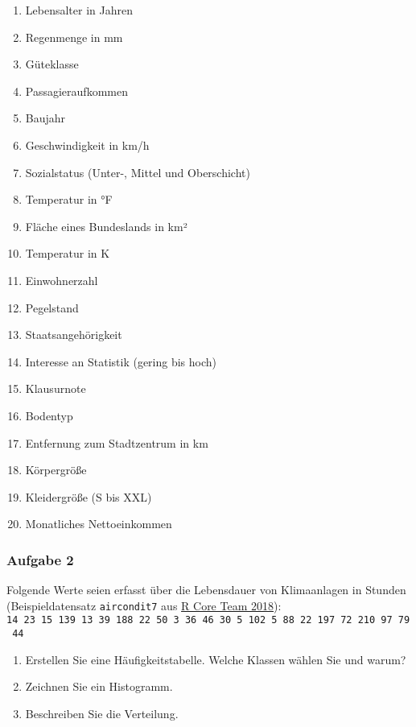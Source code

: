 \documentclass[
  ngerman,
]{article}
\providecommand{\tightlist}{%
  \setlength{\itemsep}{0pt}\setlength{\parskip}{0pt}}
\begin{document}
\begin{enumerate}
\def\labelenumi{\alph{enumi})}
\tightlist
\item
  Lebensalter in Jahren
\item
  Regenmenge in mm
\item
  Güteklasse
\item
  Passagieraufkommen
\item
  Baujahr
\item
  Geschwindigkeit in km/h
\item
  Sozialstatus (Unter-, Mittel und Oberschicht)
\item
  Temperatur in °F
\item
  Fläche eines Bundeslands in km²
\item
  Temperatur in K
\item
  Einwohnerzahl
\item
  Pegelstand
\item
  Staatsangehörigkeit
\item
  Interesse an Statistik (gering bis hoch)
\item
  Klausurnote
\item
  Bodentyp
\item
  Entfernung zum Stadtzentrum in km
\item
  Körpergröße
\item
  Kleidergröße (S bis XXL)
\item
  Monatliches Nettoeinkommen
\end{enumerate}

\hypertarget{aufgabe-2}{%
\subsubsection{Aufgabe 2}\label{aufgabe-2}}

Folgende Werte seien erfasst über die Lebensdauer von Klimaanlagen in Stunden (Beispieldatensatz \texttt{aircondit7} aus \protect\hyperlink{ref-r}{R Core Team 2018}):\\
\texttt{14\ 23\ 15\ 139\ 13\ 39\ 188\ 22\ 50\ 3\ 36\ 46\ 30\ 5\ 102\ 5\ 88\ 22\ 197\ 72\ 210\ 97\ 79\ 44}

\begin{enumerate}
\def\labelenumi{\alph{enumi})}
\tightlist
\item
  Erstellen Sie eine Häufigkeitstabelle. Welche Klassen wählen Sie und warum?
\item
  Zeichnen Sie ein Histogramm.
\item
  Beschreiben Sie die Verteilung.
\end{enumerate}
\end{document}
